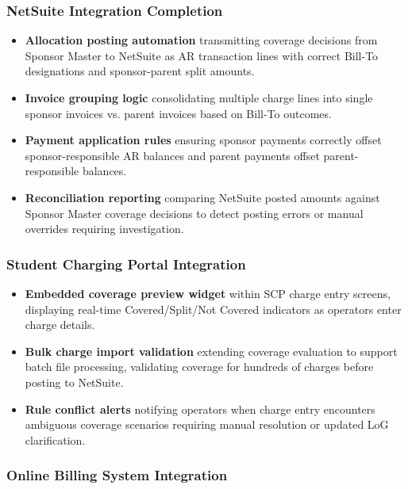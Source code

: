 \subsubsection{NetSuite Integration Completion}

\begin{itemize}
    \item \textbf{Allocation posting automation} transmitting coverage decisions from Sponsor Master to NetSuite as AR transaction lines with correct Bill-To designations and sponsor-parent split amounts.
    \item \textbf{Invoice grouping logic} consolidating multiple charge lines into single sponsor invoices vs. parent invoices based on Bill-To outcomes.
    \item \textbf{Payment application rules} ensuring sponsor payments correctly offset sponsor-responsible AR balances and parent payments offset parent-responsible balances.
    \item \textbf{Reconciliation reporting} comparing NetSuite posted amounts against Sponsor Master coverage decisions to detect posting errors or manual overrides requiring investigation.
\end{itemize}

\subsubsection{Student Charging Portal Integration}

\begin{itemize}
    \item \textbf{Embedded coverage preview widget} within SCP charge entry screens, displaying real-time Covered/Split/Not Covered indicators as operators enter charge details.
    \item \textbf{Bulk charge import validation} extending coverage evaluation to support batch file processing, validating coverage for hundreds of charges before posting to NetSuite.
    \item \textbf{Rule conflict alerts} notifying operators when charge entry encounters ambiguous coverage scenarios requiring manual resolution or updated LoG clarification.
\end{itemize}

\subsubsection{Online Billing System Integration}

